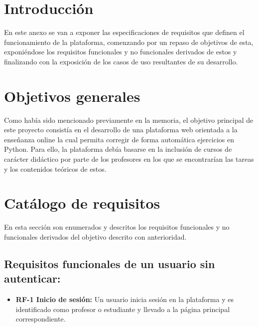 
\section{Introducción}
En este anexo se van a exponer las especificaciones de requisitos que definen el funcionamiento de la plataforma, comenzando por un repaso de objetivos de esta, exponiéndose los requisitos funcionales y no funcionales derivados de estos y finalizando con la exposición de los casos de uso resultantes de su desarrollo.

\section{Objetivos generales}
Como había sido mencionado previamente en la memoria, el objetivo principal de este proyecto consistía en el desarrollo de una plataforma web orientada a la enseñanza online la cual permita corregir de forma automática ejercicios en Python. Para ello, la plataforma debía basarse en la inclusión de cursos de carácter didáctico por parte de los profesores en los que se encontrarían las tareas y los contenidos teóricos de estos.

\newpage

\section{Catálogo de requisitos}
En esta sección son enumerados y descritos los requisitos funcionales y no funcionales derivados del objetivo descrito con anterioridad.

\subsection{Requisitos funcionales de un usuario sin autenticar:}
\begin{itemize}
\tightlist
\item
  \textbf{RF-1 Inicio de sesión:} Un usuario inicia sesión en la plataforma y es identificado
  como profesor o estudiante y llevado a la página principal correspondiente.
  
\end{itemize}

